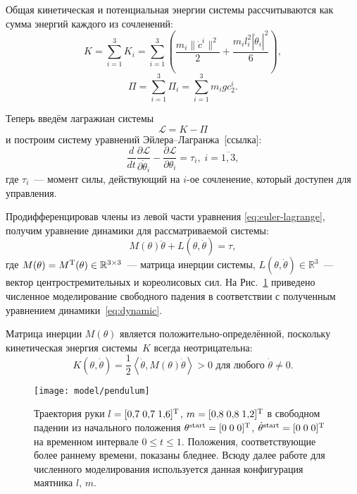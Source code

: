\documentclass[../../doc.tex]{subfiles}
\begin{document}
    Общая кинетическая и потенциальная энергии системы рассчитываются как сумма энергий каждого из сочленений:
    $$
        K = \sum_{i=1}^{3} K_i = \sum_{i=1}^{3}\left( \frac{m_i \|\dot c^i\|^2}{2} + \frac{m_i l_i^2 |\dot \theta_i|^2}{6} \right),
    $$
    $$
        \Pi = \sum_{i=1}^{3} \Pi_i = \sum_{i=1}^{3} m_i g c^i_2.
    $$

    Теперь введём лагражиан системы
    $$
        \mathcal{L} = K - \Pi
    $$
    и построим систему уравнений Эйлера--Лагранжа~[ссылка]:
    \begin{equation}\label{eq:euler-lagrange}
        \frac{d}{dt} \frac{\partial \mathcal{L}}{\partial \dot \theta_i} - \frac{\partial \mathcal{L}}{\partial \theta_i} = \tau_i,\; i = \overline{1, 3},
    \end{equation}
    где $\tau_i$~--- момент силы, действующий на $i$-ое сочленение, который доступен для управления.

    Продифференцировав члены из левой части уравнения \eqref{eq:euler-lagrange}, получим уравнение динамики для рассматриваемой системы:
    \begin{equation}\label{eq:dynamic}
        M(\theta)\ddot\theta + L(\theta, \dot\theta) = \tau,
    \end{equation}
    где $M(\theta) = M ^\textnormal{T} (\theta) \in \mathbb{R}^{3 \times 3}$~--- матрица инерции системы, $L(\theta, \dot\theta)\in\mathbb{R}^{3}$~--- вектор центростремительных и кореолисовых сил.
    На Рис.~\ref{img:pendulum} приведено численное моделирование свободного падения в соответствии с полученным уравнением динамики~\eqref{eq:dynamic}.

    \begin{remark}
        Матрица инерции $M(\theta)$ является положительно-опре\-де\-лён\-ной, поскольку кинетическая энергия системы~$K$ всегда неотрицательна:
        \begin{equation*}
            K(\theta, \dot\theta) = \frac{1}{2}\left\langle \dot \theta, M(\theta) \dot \theta \right\rangle > 0 \mbox{ для любого } \dot \theta \neq 0.
        \end{equation*}
    \end{remark}

    \begin{figure}[h]
        \begin{center}
            \texttt{[image: model/pendulum]}
        \end{center}
        \caption{
            Траектория руки $l = [0,\!7\; 0,\!7\; 1,\!6]^\textnormal{T}$, $m = [0,\!8\; 0,\!8\; 1,\!2]^\textnormal{T}$ в свободном падении из начального положения $\theta^{\textnormal{start}} = [0\; 0\; 0]^\textnormal{T}$, $\dot\theta^{\textnormal{start}} = [0\;0\;0]^\textnormal{T}$ на временном интервале $0 \leqslant t \leqslant 1$.
            Положения, соответствующие более раннему времени, показаны бледнее.
            Всюду далее работе для численного моделирования используется данная конфигурация маятника $l$, $m$.
        }
        \label{img:pendulum}
    \end{figure}

    \ifSubfilesClassLoaded{
        \nocite{*}
        \clearpage
        
        
    }{}
\end{document}
